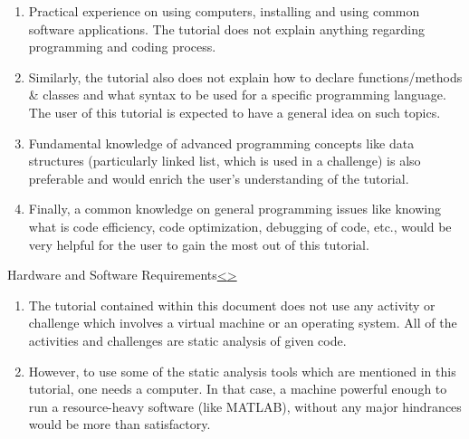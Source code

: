\documentclass[12pt]{extarticle}
\newenvironment{instructionblock}{\Large\bgroup}{\egroup}
\newcommand{\ben}{\begin{enumerate}}
\newcommand{\een}{\end{enumerate}}
\begin{document}
\ben


\item Practical experience on using computers, installing and using common software applications. The tutorial does not explain anything regarding programming and coding process. 

\item Similarly, the tutorial also does not explain how to declare functions/methods \& classes and what syntax to be used for a specific programming language. The user of this tutorial is expected to have a general idea on such topics. 

\item Fundamental knowledge of advanced programming concepts like data structures (particularly linked list, which is used in a challenge) is also preferable and would enrich the user's understanding of the tutorial. 

\item Finally, a common knowledge on general programming issues like knowing what is code efficiency, code optimization, debugging of code, etc., would be very helpful for the user to gain the most out of this tutorial.


\een 




\pagebreak
\begin{slide}{Hardware and Software Requirements}{\hyperref[slide 2]{\textless}\hyperref[slide 4]{\textgreater}}
	\begin{instructionblock}
		
		\ben
		
			\item  The tutorial contained within this document does not use any activity or challenge which involves a virtual machine or an operating system. All of the activities and challenges are static analysis of given code. 
			
			\item  However, to use some of the static analysis tools which are mentioned in this tutorial, one needs a computer. In that case, a machine powerful enough to run a resource-heavy software (like MATLAB), without any major hindrances would be more than satisfactory.
			
		\een
	\end{instructionblock}
\end{slide}
\end{document}
